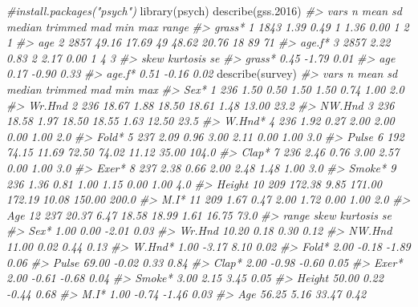 \documentclass[
]{book}
\newenvironment{Shaded}{\begin{snugshade}}{\end{snugshade}}
\newcommand{\CommentTok}[1]{\textcolor[rgb]{0.56,0.35,0.01}{\textit{#1}}}
\newcommand{\FloatTok}[1]{\textcolor[rgb]{0.00,0.00,0.81}{#1}}
\newcommand{\FunctionTok}[1]{\textcolor[rgb]{0.00,0.00,0.00}{#1}}
\newcommand{\NormalTok}[1]{#1}
\begin{document}
\begin{Shaded}
\begin{Highlighting}[]
\CommentTok{\#install.packages("psych")}
\FunctionTok{library}\NormalTok{(psych)}
\FunctionTok{describe}\NormalTok{(gss}\FloatTok{.2016}\NormalTok{)}
\CommentTok{\#\textgreater{}        vars    n  mean    sd median trimmed   mad min max range}
\CommentTok{\#\textgreater{} grass*    1 1843  1.39  0.49      1    1.36  0.00   1   2     1}
\CommentTok{\#\textgreater{} age       2 2857 49.16 17.69     49   48.62 20.76  18  89    71}
\CommentTok{\#\textgreater{} age.f*    3 2857  2.22  0.83      2    2.17  0.00   1   4     3}
\CommentTok{\#\textgreater{}        skew kurtosis   se}
\CommentTok{\#\textgreater{} grass* 0.45    {-}1.79 0.01}
\CommentTok{\#\textgreater{} age    0.17    {-}0.90 0.33}
\CommentTok{\#\textgreater{} age.f* 0.51    {-}0.16 0.02}
\FunctionTok{describe}\NormalTok{(survey)}
\CommentTok{\#\textgreater{}        vars   n   mean    sd median trimmed   mad    min   max}
\CommentTok{\#\textgreater{} Sex*      1 236   1.50  0.50   1.50    1.50  0.74   1.00   2.0}
\CommentTok{\#\textgreater{} Wr.Hnd    2 236  18.67  1.88  18.50   18.61  1.48  13.00  23.2}
\CommentTok{\#\textgreater{} NW.Hnd    3 236  18.58  1.97  18.50   18.55  1.63  12.50  23.5}
\CommentTok{\#\textgreater{} W.Hnd*    4 236   1.92  0.27   2.00    2.00  0.00   1.00   2.0}
\CommentTok{\#\textgreater{} Fold*     5 237   2.09  0.96   3.00    2.11  0.00   1.00   3.0}
\CommentTok{\#\textgreater{} Pulse     6 192  74.15 11.69  72.50   74.02 11.12  35.00 104.0}
\CommentTok{\#\textgreater{} Clap*     7 236   2.46  0.76   3.00    2.57  0.00   1.00   3.0}
\CommentTok{\#\textgreater{} Exer*     8 237   2.38  0.66   2.00    2.48  1.48   1.00   3.0}
\CommentTok{\#\textgreater{} Smoke*    9 236   1.36  0.81   1.00    1.15  0.00   1.00   4.0}
\CommentTok{\#\textgreater{} Height   10 209 172.38  9.85 171.00  172.19 10.08 150.00 200.0}
\CommentTok{\#\textgreater{} M.I*     11 209   1.67  0.47   2.00    1.72  0.00   1.00   2.0}
\CommentTok{\#\textgreater{} Age      12 237  20.37  6.47  18.58   18.99  1.61  16.75  73.0}
\CommentTok{\#\textgreater{}        range  skew kurtosis   se}
\CommentTok{\#\textgreater{} Sex*    1.00  0.00    {-}2.01 0.03}
\CommentTok{\#\textgreater{} Wr.Hnd 10.20  0.18     0.30 0.12}
\CommentTok{\#\textgreater{} NW.Hnd 11.00  0.02     0.44 0.13}
\CommentTok{\#\textgreater{} W.Hnd*  1.00 {-}3.17     8.10 0.02}
\CommentTok{\#\textgreater{} Fold*   2.00 {-}0.18    {-}1.89 0.06}
\CommentTok{\#\textgreater{} Pulse  69.00 {-}0.02     0.33 0.84}
\CommentTok{\#\textgreater{} Clap*   2.00 {-}0.98    {-}0.60 0.05}
\CommentTok{\#\textgreater{} Exer*   2.00 {-}0.61    {-}0.68 0.04}
\CommentTok{\#\textgreater{} Smoke*  3.00  2.15     3.45 0.05}
\CommentTok{\#\textgreater{} Height 50.00  0.22    {-}0.44 0.68}
\CommentTok{\#\textgreater{} M.I*    1.00 {-}0.74    {-}1.46 0.03}
\CommentTok{\#\textgreater{} Age    56.25  5.16    33.47 0.42}


\end{Highlighting}
\end{Shaded}
\end{document}
